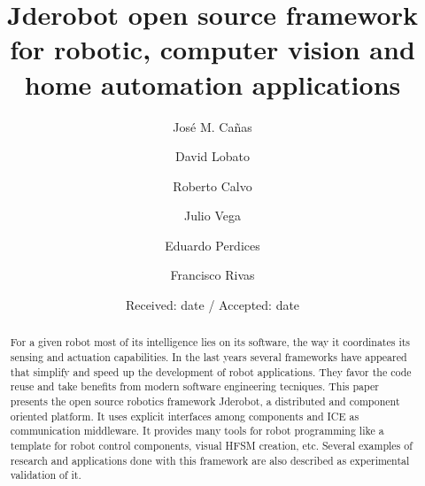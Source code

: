\documentclass[twocolumn]{svjour3}          %
\begin{document}
\title{Jderobot open source framework for robotic, computer vision and home automation applications
}


\author{José M. Cañas \and David Lobato \and Roberto Calvo \and Julio Vega \and Eduardo Perdices \and Francisco Rivas}



\date{Received: date / Accepted: date}


\maketitle

\begin{abstract}
For a given robot most of its intelligence lies on its software, the way it coordinates its sensing and actuation capabilities. In the last years several frameworks have appeared that simplify and speed up the development of robot applications. They favor the code reuse and take benefits from modern software engineering tecniques. This paper presents the open source robotics framework Jderobot, a distributed and component oriented platform. It uses explicit interfaces among components and ICE as communication middleware. It provides many tools for robot programming like a template for robot control components, visual HFSM creation, etc. Several examples of research and applications done with this framework are also described as experimental validation of it.
\end{abstract}
\end{document}
